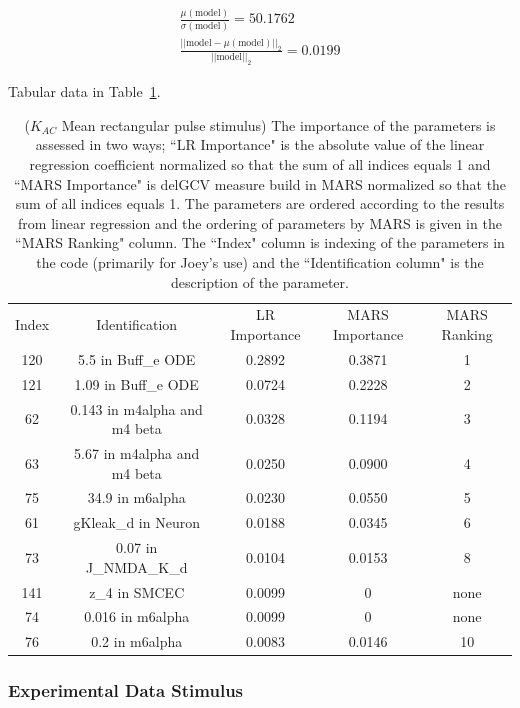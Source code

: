 \documentclass[12pt]{article}
\numberwithin{equation}{section}
\begin{document}
\begin{eqnarray*}
\frac{\mu(\text{model})}{\sigma(\text{model})} = 50.1762\\
\frac{\vert \vert \text{model}-\mu(\text{model}) \vert \vert_2 }{\vert \vert \text{model}\vert \vert_2 } = 0.0199
\end{eqnarray*}

Tabular data in Table~\ref{qoi_K_AC_Mean_rec}.

\begin{table}[h]
\centering
\begin{tabular}{ccccc}
Index & Identification & LR Importance & MARS Importance & MARS Ranking \\
120 & 5.5 in Buff\_e ODE & 0.2892 &  0.3871 & 1\\
121 & 1.09 in Buff\_e ODE & 0.0724 & 0.2228 & 2\\
62 & 0.143 in m4alpha and m4 beta & 0.0328 &  0.1194 & 3\\
63 &   5.67 in m4alpha and m4 beta & 0.0250 & 0.0900 & 4\\
75 & 34.9 in m6alpha & 0.0230 & 0.0550 & 5\\
61 & gKleak\_d in Neuron & 0.0188 & 0.0345 & 6\\
73 & 0.07 in J\_NMDA\_K\_d & 0.0104 & 0.0153 & 8\\
141 & z\_4 in SMCEC & 0.0099 & 0 & none\\
74 & 0.016 in m6alpha & 0.0099 & 0 & none\\
76 & 0.2 in m6alpha & 0.0083 & 0.0146 & 10\\
\end{tabular}
\caption{($K_{AC}$ Mean rectangular pulse stimulus) The importance of the parameters is assessed in two ways; ``LR Importance" is the absolute value of the linear regression coefficient normalized so that the sum of all indices equals 1 and ``MARS Importance" is delGCV measure build in MARS normalized so that the sum of all indices equals 1. The parameters are ordered according to the results from linear regression and the ordering of parameters by MARS is given in the ``MARS Ranking" column. The ``Index" column is indexing of the parameters in the code (primarily for Joey's use) and the ``Identification column" is the description of the parameter.}
\label{qoi_K_AC_Mean_rec}
\end{table}

\newpage

\subsubsection{Experimental Data Stimulus}
\end{document}
